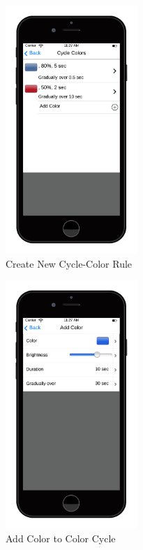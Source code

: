 \documentclass[12pt]{article}
\begin{document}
  \begin{figure}[ht!]
    \centering
    \includegraphics[width=50mm]{Cycle_Colors.png}
    \caption{Create New Cycle-Color Rule}
    \label{fig:newCycleColorRule}
  \end{figure}
  
  \begin{figure}[ht!]
    \centering
    \includegraphics[width=50mm]{Add_Color.png}
    \caption{Add Color to Color Cycle}
    \label{fig:addColorCycle}
  \end{figure}
  
\end{document}
